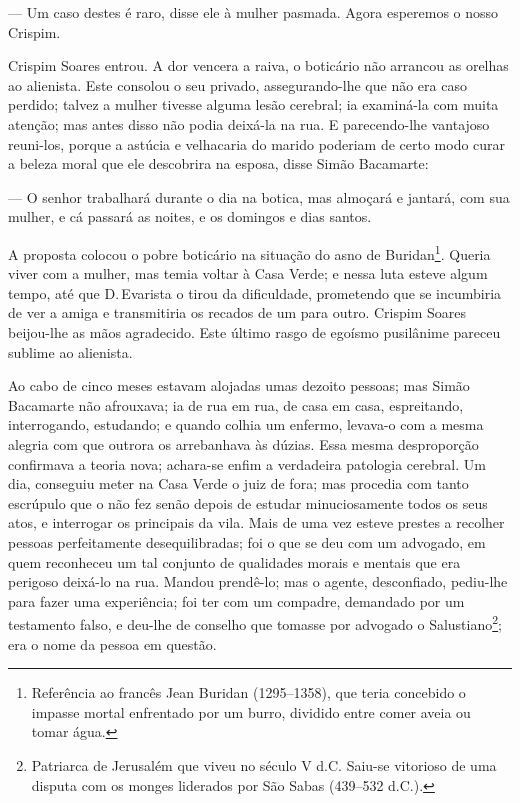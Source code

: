 --- Um caso destes é raro, disse ele à mulher pasmada. Agora esperemos o
nosso Crispim.

Crispim Soares entrou. A dor vencera a raiva, o boticário não arrancou
as orelhas ao alienista. Este consolou o seu privado, assegurando-lhe
que não era caso perdido; talvez a mulher tivesse alguma lesão cerebral;
ia examiná-la com muita atenção; mas antes disso não podia deixá-la na
rua. E parecendo-lhe vantajoso reuni-los, porque a astúcia e velhacaria
do marido poderiam de certo modo curar a beleza moral que ele descobrira
na esposa, disse Simão Bacamarte:

--- O senhor trabalhará durante o dia na botica, mas almoçará e jantará,
com sua mulher, e cá passará as noites, e os domingos e dias santos.

A proposta colocou o pobre boticário na situação do asno de
Buridan\footnote{Referência ao francês Jean Buridan (1295--1358), que
  teria concebido o impasse mortal enfrentado por um burro, dividido
  entre comer aveia ou tomar água.}. Queria viver com a mulher, mas
temia voltar à Casa Verde; e nessa luta esteve algum tempo, até que D.\,Evarista o tirou da dificuldade, prometendo que se incumbiria de ver a
amiga e transmitiria os recados de um para outro. Crispim Soares
beijou-lhe as mãos agradecido. Este último rasgo de egoísmo pusilânime
pareceu sublime ao alienista.

Ao cabo de cinco meses estavam alojadas umas dezoito pessoas; mas Simão
Bacamarte não afrouxava; ia de rua em rua, de casa em casa, espreitando,
interrogando, estudando; e quando colhia um enfermo, levava-o com a
mesma alegria com que outrora os arrebanhava às dúzias. Essa mesma
desproporção confirmava a teoria nova; achara-se enfim a verdadeira
patologia cerebral. Um dia, conseguiu meter na Casa Verde o juiz de
fora; mas procedia com tanto escrúpulo que o não fez senão depois de
estudar minuciosamente todos os seus atos, e interrogar os principais da
vila. Mais de uma vez esteve prestes a recolher pessoas perfeitamente
desequilibradas; foi o que se deu com um advogado, em quem reconheceu um
tal conjunto de qualidades morais e mentais que era perigoso deixá-lo na
rua. Mandou prendê-lo; mas o agente, desconfiado, pediu-lhe para fazer
uma experiência; foi ter com um compadre, demandado por um testamento
falso, e deu-lhe de conselho que tomasse por advogado o
Salustiano\footnote{Patriarca de Jerusalém que viveu no século V d.C.
  Saiu-se vitorioso de uma disputa com os monges liderados por São Sabas
  (439--532 d.C.).}; era o nome da pessoa em questão.

